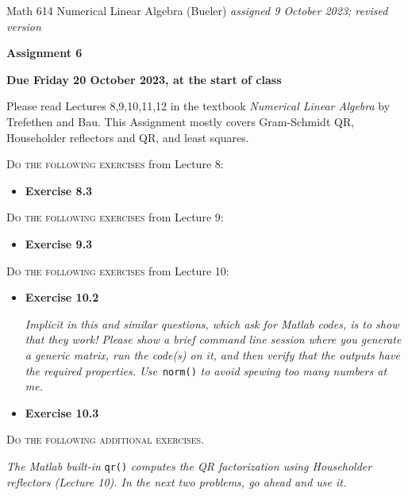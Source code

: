 \documentclass[12pt]{amsart}
\begin{document}
\scriptsize \noindent Math 614 Numerical Linear Algebra (Bueler) \hfill \emph{assigned 9 October 2023; revised version}
\normalsize\medskip

\Large\centerline{\textbf{Assignment 6}}
\large
\medskip

\centerline{\textbf{Due Friday 20 October 2023, at the start of class}}
\medskip
\normalsize

\thispagestyle{empty}

\bigskip
\noindent Please read Lectures 8,9,10,11,12 in the textbook \emph{Numerical Linear Algebra} by Trefethen and Bau.  This Assignment mostly covers Gram-Schmidt QR, Householder reflectors and QR, and least squares.

\bigskip
\noindent \textsc{Do the following exercises} from Lecture 8:

\begin{itemize}
\item \textbf{Exercise 8.3}
\end{itemize}

\bigskip
\noindent \textsc{Do the following exercises} from Lecture 9:

\begin{itemize}
\item \textbf{Exercise 9.3}
\end{itemize}

\bigskip
\noindent \textsc{Do the following exercises} from Lecture 10:

\begin{itemize}
\item \textbf{Exercise 10.2}  \qquad \begin{minipage}[t]{0.68\textwidth}  \emph{Implicit in this and similar questions, which ask for Matlab codes, is to show that they work!  Please show a brief command line session where you generate a generic matrix, run the code(s) on it, and then verify that the outputs have the required properties.  Use} \,\texttt{norm()} \emph{to avoid spewing too many numbers at me.}
\end{minipage}
\item \textbf{Exercise 10.3}
\end{itemize}


\bigskip
\noindent \textsc{Do the following additional exercises.}

\medskip
\noindent \emph{The Matlab built-in} \texttt{qr()} \emph{computes the QR factorization using Householder reflectors (Lecture 10).  In the next two problems, go ahead and use it.}
\end{document}
